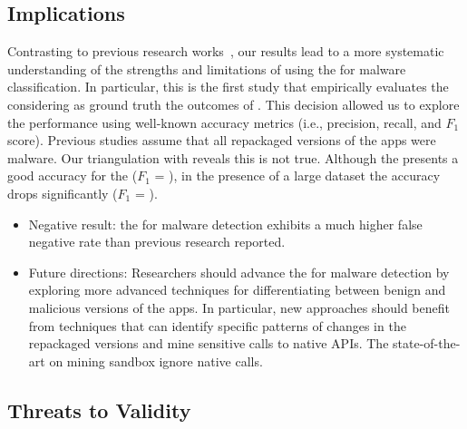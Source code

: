 \subsection{Implications}\label{sec:implications} 

Contrasting to previous research works~\cite{DBLP:conf/wcre/BaoLL18,DBLP:conf/iceccs/LeB0GL18,DBLP:journals/jss/CostaMMSSBNR22},
our results 
lead to a more systematic understanding
of the strengths and limitations of using the \mas
for malware classification. In particular, this is the
first study that empirically evaluates the \mas
considering as ground truth the outcomes
of \vt. This decision allowed us to explore the
\mas performance using well-known accuracy metrics (i.e., precision, recall, and
$F_1$ score). Previous studies assume that all repackaged versions of the
apps were malware. Our triangulation with \vt reveals this is not true. Although
the \mas presents a good accuracy for the \sds ($F_1$ = \fscoreSmall), 
in the presence of a large dataset the \mas accuracy drops significantly ($F_1$ = \fscore). 


\begin{itemize}
  \item Negative result: the \mas for malware detection exhibits a much higher false negative rate than previous research reported. 

  \item Future directions: Researchers should advance the \mas for malware detection by exploring more advanced techniques for differentiating between benign and malicious versions of the apps. In particular, new approaches should benefit from techniques that can identify specific patterns of changes in the repackaged versions and mine sensitive calls to native APIs. The state-of-the-art on mining sandbox ignore native calls.
    
\end{itemize}  


\subsection{Threats to Validity}\label{sec:threats}


